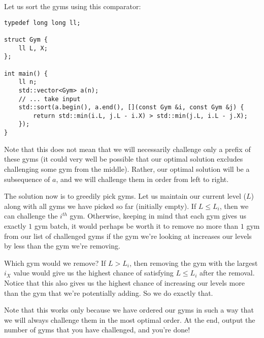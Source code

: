 \documentclass{article}
\begin{document}
Let us sort the gyms using this comparator:
\begin{verbatim}
typedef long long ll;

struct Gym {
    ll L, X;
};

int main() {
    ll n;
    std::vector<Gym> a(n);
    // ... take input
    std::sort(a.begin(), a.end(), [](const Gym &i, const Gym &j) {
        return std::min(i.L, j.L - i.X) > std::min(j.L, i.L - j.X);
    });
}
\end{verbatim}

Note that this does not mean that we will necessarily challenge only a prefix of these gyms (it could very well be possible that our optimal solution excludes challenging some gym from the middle). Rather, our optimal solution will be a subsequence of $a$, and we will challenge them in order from left to right.

The solution now is to greedily pick gyms. Let us maintain our current level ($L$) along with all gyms we have picked so far (initially empty). If $L\le L_i$, then we can challenge the $i^{th}$ gym. Otherwise, keeping in mind that each gym gives us exactly $1$ gym batch, it would perhaps be worth it to remove no more than $1$ gym from our list of challenged gyms if the gym we're looking at increases our levels by less than the gym we're removing.

Which gym would we remove? If $L>L_i$, then removing the gym with the largest $i_X$ value would give us the highest chance of satisfying $L\le L_i$ after the removal. Notice that this also gives us the highest chance of increasing our levels more than the gym that we're potentially adding. So we do exactly that.

Note that this works only because we have ordered our gyms in such a way that we will always challenge them in the most optimal order. At the end, output the number of gyms that you have challenged, and you're done!
\end{document}
